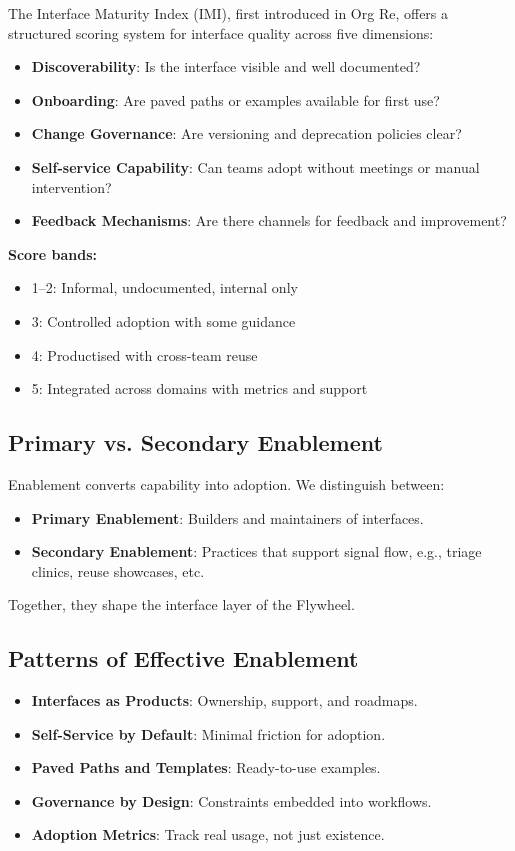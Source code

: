 \documentclass[12pt]{article}
\begin{document}
The Interface Maturity Index (IMI), first introduced in Org Re, offers a structured scoring system for interface quality across five dimensions:
\begin{itemize}
    \item \textbf{Discoverability}: Is the interface visible and well documented?
    \item \textbf{Onboarding}: Are paved paths or examples available for first use?
    \item \textbf{Change Governance}: Are versioning and deprecation policies clear?
    \item \textbf{Self-service Capability}: Can teams adopt without meetings or manual intervention?
    \item \textbf{Feedback Mechanisms}: Are there channels for feedback and improvement?
\end{itemize}

\textbf{Score bands:}
\begin{itemize}
    \item 1--2: Informal, undocumented, internal only
    \item 3: Controlled adoption with some guidance
    \item 4: Productised with cross-team reuse
    \item 5: Integrated across domains with metrics and support
\end{itemize}

\subsection*{Primary vs. Secondary Enablement}

Enablement converts capability into adoption. We distinguish between:
\begin{itemize}
    \item \textbf{Primary Enablement}: Builders and maintainers of interfaces.
    \item \textbf{Secondary Enablement}: Practices that support signal flow, e.g., triage clinics, reuse showcases, etc.
\end{itemize}

Together, they shape the interface layer of the Flywheel.

\subsection*{Patterns of Effective Enablement}
\begin{itemize}
    \item \textbf{Interfaces as Products}: Ownership, support, and roadmaps.
    \item \textbf{Self-Service by Default}: Minimal friction for adoption.
    \item \textbf{Paved Paths and Templates}: Ready-to-use examples.
    \item \textbf{Governance by Design}: Constraints embedded into workflows.
    \item \textbf{Adoption Metrics}: Track real usage, not just existence.
\end{itemize}
\end{document}
